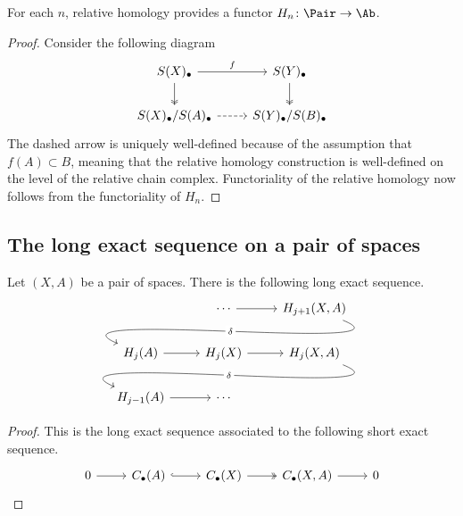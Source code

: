 \documentclass[main.tex]{subfiles}
\begin{document}
\begin{lemma}
  \label{lemma:relative_homology_functorial}
  For each $n$, relative homology provides a functor $H_{n}\colon \Pair \to \Ab$.
\end{lemma}
\begin{proof}
  Consider the following diagram
  \begin{equation*}
    \begin{tikzcd}
      S(X)_{\bullet}
      \arrow[r, "f"]
      \arrow[d, two heads]
      & S(Y)_{\bullet}
      \arrow[d, two heads]
      \\
      S(X)_{\bullet}/S(A)_{\bullet}
      \arrow[r, dashed]
      & S(Y)_{\bullet}/S(B)_{\bullet}
    \end{tikzcd}
  \end{equation*}
  The dashed arrow is uniquely well-defined because of the assumption that $f(A) \subset B$, meaning that the relative homology construction is well-defined on the level of the relative chain complex. Functoriality of the relative homology now follows from the functoriality of $H_{n}$.
\end{proof}

\subsection{The long exact sequence on a pair of spaces}
\label{ssc:the_long_exact_sequence_on_a_pair_of_spaces}

\begin{proposition}
  \label{prop:les_on_a_pair_of_spaces}
  Let $(X, A)$ be a pair of spaces. There is the following long exact sequence.
  \begin{equation*}
    \begin{tikzcd}
      & \cdots
      \arrow[r]
      & H_{j+1}(X, A)
      \\
      H_{j}(A)
      \arrow[from=urr, out=-22, in=157, looseness=1, overlay, "\delta" description]
      \arrow[r,]
      & H_{j}(X)
      \arrow[r,]
      & H_{j}(X, A)
      \\
      H_{j-1}(A)
      \arrow[r]
      \arrow[from=urr, out=-22, in=157, looseness=1, overlay, "\delta" description]
      & \cdots
    \end{tikzcd}
  \end{equation*}
\end{proposition}
\begin{proof}
  This is the long exact sequence associated to the following short exact sequence.
  \begin{equation*}
    \begin{tikzcd}
      0
      \arrow[r]
      & C_{\bullet}(A)
      \arrow[r, hook]
      & C_{\bullet}(X)
      \arrow[r, two heads]
      & C_{\bullet}(X, A)
      \arrow[r]
      & 0
    \end{tikzcd}
  \end{equation*}
\end{proof}
\end{document}
